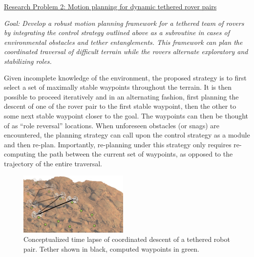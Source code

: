 \documentclass[12pt]{article}
\begin{document}

\noindent\underline{Research Problem 2: Motion planning for dynamic
  tethered rover pairs }

{\sl Goal: Develop a robust motion planning framework for a tethered
  team of rovers by integrating the control strategy outlined above as
  a subroutine in cases of environmental obstacles and tether
  entanglements. This framework can plan the coordinated traversal of
  difficult terrain while the rovers alternate exploratory and
  stabilizing roles. }


Given incomplete knowledge of the environment, the proposed strategy
is to first select a set of maximally stable waypoints throughout the
terrain. It is then possible to proceed iteratively and in an
alternating fashion, first planning the descent of one of the rover
pair to the first stable waypoint, then the other to some next stable
waypoint closer to the goal. The waypoints can then be thought of as
``role reversal'' locations. When unforeseen obstacles (or snags) are
encountered, the planning strategy can call upon the control strategy
as a module and then re-plan.  Importantly, re-planning under this
strategy only requires re-computing the path between the current set
of waypoints, as opposed to the trajectory of the entire traversal.

\begin{figure}
  \begin{center}
  \vspace{-0.2in} 
  \includegraphics[width=0.48\textwidth, left]{descent_2.png}
  \end{center}
  \vspace{-0.2in}
  \label{fig:descent}
  \caption{Conceptualized time lapse of coordinated descent of a tethered robot pair. Tether shown in black, computed 
  waypoints in green.} \vspace{-.2in}
\end{figure}
\end{document}
